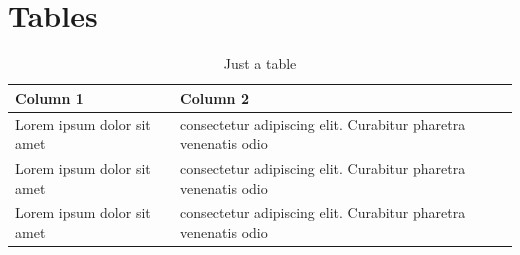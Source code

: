 \section{Tables}
%
\begin{center}
 \begin{table}[htbc]				%
  \begin{tabular}{ l | l }			%
    \hline
    Column 1 & Column 2 \\
    \hline
    Lorem ipsum dolor sit amet & consectetur adipiscing elit. Curabitur pharetra venenatis odio \\
    Lorem ipsum dolor sit amet & consectetur adipiscing elit. Curabitur pharetra venenatis odio \\
    Lorem ipsum dolor sit amet & consectetur adipiscing elit. Curabitur pharetra venenatis odio \\
    \hline
  \end{tabular}
  \label{table:label:for:reference}		%
  \caption{Just a table}			%
 \end{table}
\end{center}
%
